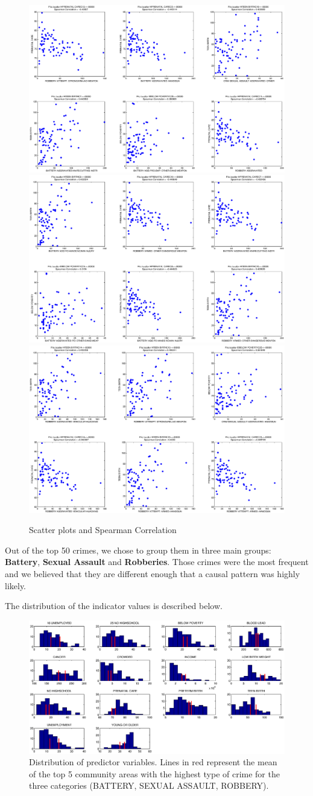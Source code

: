 \documentclass[a4paper,10pt]{article}
\begin{document}
\begin{figure}[H]
\includegraphics[width=0.3\linewidth]{media/ScatterPlot7.eps}
\includegraphics[width=0.3\linewidth]{media/ScatterPlot8.eps}\hspace{1cm}
\includegraphics[width=0.3\linewidth]{media/ScatterPlot9.eps}
\caption{Scatter plots and Spearman Correlation}
\end{figure}

Out of the top 50 crimes, we chose to group them in three main groups: \textbf{Battery}, \textbf{Sexual Assault} and \textbf{Robberies}. Those crimes were the most frequent and we believed that they are different enough that a causal pattern was highly likely.

The distribution of the indicator values is described below.

\begin{figure}[ht]
	\includegraphics[width=\linewidth]{media/distribution.eps}
	\caption{Distribution of predictor variables. Lines in red represent the mean of the top 5 community areas with the highest type of crime for the three categories (BATTERY, SEXUAL ASSAULT, ROBBERY).}
\end{figure}
\end{document}
